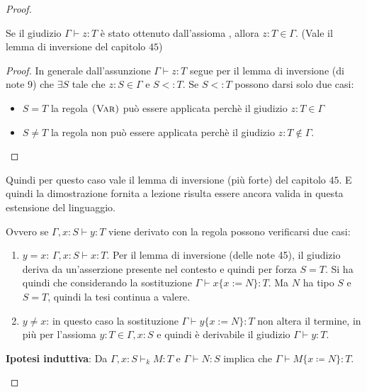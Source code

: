 \begin{proof}
\begin{itemize}
\begin{itemize}
			Se il giudizio $\Gamma \vdash z : T$ \`e stato ottenuto dall'assioma , allora $z : T \in \Gamma$.
			(Vale il lemma di inversione del capitolo $45$)
			\begin{proof}
			In generale dall'assunzione $\Gamma \vdash z : T$ segue per il lemma di inversione (di note 9) che $\exists S$ tale che $z: S \in \Gamma$ e  $S <:T$. 
			Se $S <:T$ possono darsi solo due casi:
			\begin{itemize}
				\item $\boxed{S = T}$ la regola $\textsc{(Var)}$ pu\`o essere applicata perch\`e il giudizio $z : T \in \Gamma$
				\item $\boxed{S \neq T}$ la regola  non pu\`o essere applicata 
				perch\`e il giudizio $z : T \notin \Gamma$. 
			\end{itemize}
			\end{proof}
		
		Quindi per questo caso vale il lemma di inversione (pi\`u forte) del capitolo $45$. E quindi la dimostrazione fornita a lezione
		risulta essere ancora valida in questa estensione del linguaggio.
		
		Ovvero se $\Gamma , x : S \vdash y : T$ viene derivato con la regola  possono verificarsi due casi:
		\begin{enumerate}
			\item $y = x$:  $\Gamma , x : S \vdash x : T$. Per il lemma di inversione (delle note 45), il giudizio deriva da un'asserzione presente nel contesto e quindi per forza $S = T$. Si ha quindi che considerando la sostituzione $\Gamma \vdash x\{x:=N\}:T $. Ma $N$ ha tipo $S$ e $S = T$, quindi la tesi continua a valere.
			\item $y \neq x$: in questo caso la sostituzione $\Gamma \vdash y\{x:=N\}:T $ non altera il termine, in pi\`u per l'assioma  $y : T \in \Gamma, x :S$ e quindi \`e derivabile il giudizio $\Gamma \vdash y :T$.
		\end{enumerate}\vspace{.5em}

		\noindent \textbf{Ipotesi induttiva}: Da $\Gamma, x : S \vdash_k M : T$ e $\Gamma \vdash N : S$ implica che 
		$\Gamma \vdash M\{x \coloneqq N\} : T$.
		

\end{itemize}
\end{itemize}
\end{proof}
